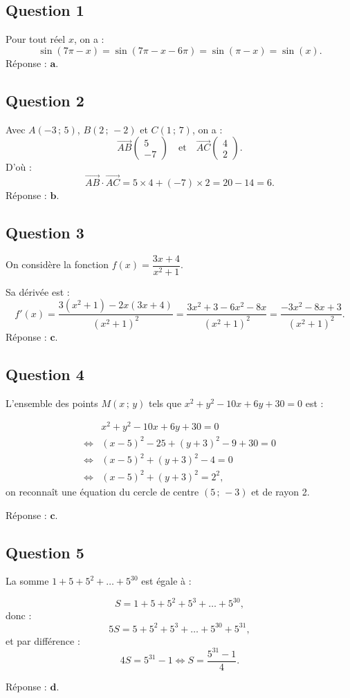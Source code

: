 \subsection*{Question 1}

Pour tout réel \(x\), on a :
\[
\sin(7\pi - x) = \sin(7\pi - x - 6\pi) = \sin(\pi - x) = \sin(x).
\]
Réponse : \(\textbf{a.}\)

\subsection*{Question 2}

Avec \( A(-3\,;\,5) \), \( B(2\,;\,-2) \) et \( C(1\,;\,7) \), on a :
\[
\overrightarrow{AB} \begin{pmatrix} 5 \\ -7 \end{pmatrix} \quad \text{et} \quad \overrightarrow{AC} \begin{pmatrix} 4 \\ 2 \end{pmatrix}.
\]
D'où :
\[
\overrightarrow{AB} \cdot \overrightarrow{AC} = 5 \times 4 + (-7) \times 2 = 20 - 14 = 6.
\]
Réponse : \(\textbf{b.}\)

\subsection*{Question 3}

On considère la fonction \(f(x) = \dfrac{3x + 4}{x^2 + 1}\).

Sa dérivée est :
\[
f'(x) = \dfrac{3(x^2 + 1) - 2x(3x + 4)}{(x^2 + 1)^2} = \dfrac{3x^2 + 3 - 6x^2 - 8x}{(x^2 + 1)^2} = \dfrac{-3x^2 - 8x + 3}{(x^2 + 1)^2}.
\]
Réponse : \(\textbf{c.}\)

\subsection*{Question 4}

L'ensemble des points \( M(x\,;\,y) \) tels que \( x^2 + y^2 - 10x + 6y + 30 = 0 \) est :

\begin{align*}
&x^2 + y^2 - 10x + 6y + 30 = 0 \\
\iff &(x - 5)^2 - 25 + (y + 3)^2 - 9 + 30 = 0 \\
\iff &(x - 5)^2 + (y + 3)^2 - 4 = 0 \\
\iff &(x - 5)^2 + (y + 3)^2 = 2^2,
\end{align*}
on reconnaît une équation du cercle de centre \( (5\,;\,-3) \) et de rayon 2.

Réponse : \(\textbf{c.}\)

\subsection*{Question 5}

La somme \( 1 + 5 + 5^2 + \dots + 5^{30} \) est égale à :

\[
S= 1 + 5 + 5^2 + 5^3 + \dots + 5^{30},
\]
donc :
\[
5S = 5 + 5^2 + 5^3 + \dots + 5^{30} + 5^{31},
\]
et par différence :
\[
4S = 5^{31} - 1 \iff S = \dfrac{5^{31} - 1}{4}.
\]

Réponse : \(\textbf{d.}\)
